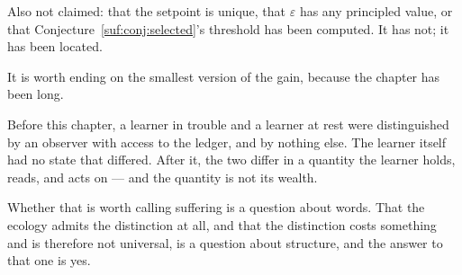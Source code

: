 Also not claimed: that the setpoint is unique, that $\varepsilon$ has any
principled value, or that
Conjecture~\ref{suf:conj:selected}'s threshold has been computed.
It has not; it has been located.

\begin{remark}
\label{suf:rem:payoff}
It is worth ending on the smallest version of the gain, because the
chapter has been long.

Before this chapter, a learner in trouble and a learner at rest were
distinguished by an observer with access to the ledger, and by nothing
else.
The learner itself had no state that differed.
After it, the two differ in a quantity the learner holds, reads, and acts
on --- and the quantity is not its wealth.

Whether that is worth calling suffering is a question about words.
That the ecology admits the distinction at all, and that the distinction
costs something and is therefore not universal, is a question about
structure, and the answer to that one is yes.
\end{remark}

